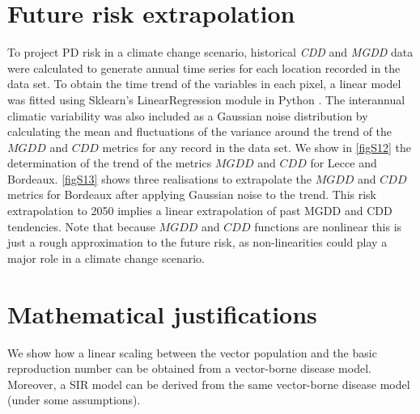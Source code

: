 \section{Future risk extrapolation}\label{app:future}

To project PD risk in a climate change scenario, historical \textit{CDD}
and \textit{MGDD} data were calculated to generate annual time series for each
location recorded in the data set. To obtain the time trend of the variables in
each pixel, a linear model was fitted using Sklearn's LinearRegression module
in Python \cite{scikit-learn}. The interannual climatic variability was also
included as a Gaussian noise distribution by calculating the mean and
fluctuations of the variance around the trend of the $MGDD$ and $CDD$ metrics
for any record in the data set. We show in \cref{figS12} the determination of
the trend of the metrics $MGDD$ and $CDD$ for Lecce and Bordeaux. \cref{figS13}
shows three realisations to extrapolate the $MGDD$ and $CDD$ metrics for
Bordeaux after applying Gaussian noise to the trend. This risk extrapolation to
2050 implies a linear extrapolation of past MGDD and CDD tendencies. Note that
because $MGDD$ and $CDD$ functions are nonlinear this is just a rough
approximation to the future risk, as non-linearities could play a major role in
a climate change scenario.

\section{Mathematical justifications}\label{app:SIR_justifications}

We show how a linear scaling between the vector population and the basic
reproduction number can be obtained from a vector-borne disease model.
Moreover, a SIR model can be derived from the same vector-borne disease model
(under some assumptions).

